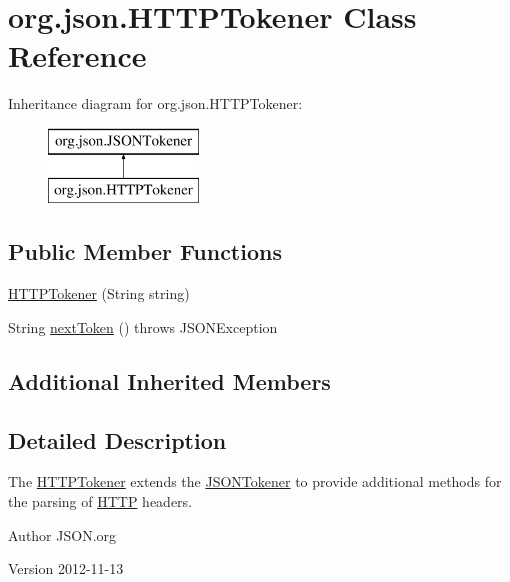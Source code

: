 \hypertarget{classorg_1_1json_1_1_h_t_t_p_tokener}{\section{org.\-json.\-H\-T\-T\-P\-Tokener Class Reference}
\label{classorg_1_1json_1_1_h_t_t_p_tokener}
}
Inheritance diagram for org.\-json.\-H\-T\-T\-P\-Tokener\-:\begin{figure}[H]
\begin{center}
\leavevmode
\includegraphics[height=2.000000cm]{classorg_1_1json_1_1_h_t_t_p_tokener}
\end{center}
\end{figure}
\subsection*{Public Member Functions}
\begin{DoxyCompactItemize}
\item 
\hyperlink{classorg_1_1json_1_1_h_t_t_p_tokener_a60475c4923ebf3ec28ed708bb0e4a6bc}{H\-T\-T\-P\-Tokener} (String string)
\item 
String \hyperlink{classorg_1_1json_1_1_h_t_t_p_tokener_a7189a17298ad2e09dce28e52bd5ccd07}{next\-Token} ()  throws J\-S\-O\-N\-Exception 
\end{DoxyCompactItemize}
\subsection*{Additional Inherited Members}


\subsection{Detailed Description}
The \hyperlink{classorg_1_1json_1_1_h_t_t_p_tokener}{H\-T\-T\-P\-Tokener} extends the \hyperlink{classorg_1_1json_1_1_j_s_o_n_tokener}{J\-S\-O\-N\-Tokener} to provide additional methods for the parsing of \hyperlink{classorg_1_1json_1_1_h_t_t_p}{H\-T\-T\-P} headers. \begin{DoxyAuthor}{Author}
J\-S\-O\-N.\-org 
\end{DoxyAuthor}
\begin{DoxyVersion}{Version}
2012-\/11-\/13 
\end{DoxyVersion}


